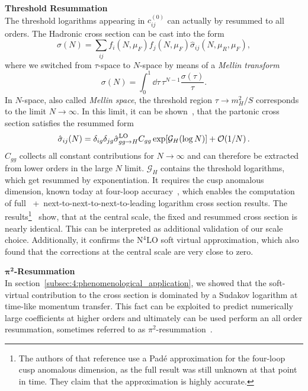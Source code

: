 \textbf{Threshold Resummation}\\
The threshold logarithms appearing in $c_{ij}^{(0)}$ can actually by resummed to all orders. The Hadronic cross section can be cast into the form
\begin{equation}
\sigma (N) = \sum_{ij} f_i(N, \mu_F) f_j(N, \mu_F) \hat{\sigma}_{ij}(N, \mu_R, \mu_F),
\end{equation}
where we switched from $\tau$-space to $N$-space by means of a \textit{Mellin transform}
\begin{equation}
\sigma (N) = \int_0^1 \dd \tau \, \tau^{N - 1} \frac{\sigma (\tau)}{\tau}.
\end{equation}
In $N$-space, also called \textit{Mellin space}, the threshold region $\tau \rightarrow m_H^2/S$ corresponds to the limit $N \rightarrow \infty$. In this limit, it can be shown~\cite{Catani:2003zt, Sterman:1986aj, Catani:1989ne, Catani:1990rp}, that the partonic cross section satisfies the resummed form
\begin{equation}
\hat{\sigma}_{ij}(N) = \delta_{ig} \delta_{jg} \hat{\sigma}_{gg \rightarrow H}^{\mathrm{LO}} C_{gg} \exp\!\left[ \mathcal{G}_H(\log N) \right] + \mathcal{O}\!\left(1/N\right).
\end{equation}
$C_{gg}$ collects all constant contributions for $N \rightarrow \infty$ and can therefore be extracted from lower orders in the large $N$ limit. $\mathcal{G}_H$ contains the threshold logarithms, which get resummed by exponentiation. It requires the cusp anomalous dimension, known today at four-loop accuracy~\cite{vonManteuffel:2020vjv}, which enables the computation of full \NNNLO\ +\ next-to-next-to-next-to-leading logarithm cross section results. The results\footnote{The authors of that reference use a Pad\'e approximation for the four-loop cusp anomalous dimension, as the full result was still unknown at that point in time. They claim that the approximation is highly accurate.}~\cite{Anastasiou:2016cez} show, that at the central scale, the fixed and resummed cross section is nearly identical. This can be interpreted as additional validation of our scale choice. Additionally, it confirms the N${}^4$LO soft virtual approximation, which also found that the corrections at the central scale are very close to zero.

$\mathbf{\pi^2}$\textbf{-Resummation}\\
In section~\ref{subsec:4:phenomenological_application}, we showed that the soft-virtual contribution to the cross section is dominated by a Sudakov logarithm at time-like momentum transfer. This fact can be exploited to predict numerically large coefficients at higher orders and ultimately can be used perform an all order resummation, sometimes referred to as $\pi^2$-resummation~\cite{Ahrens:2008qu}.

